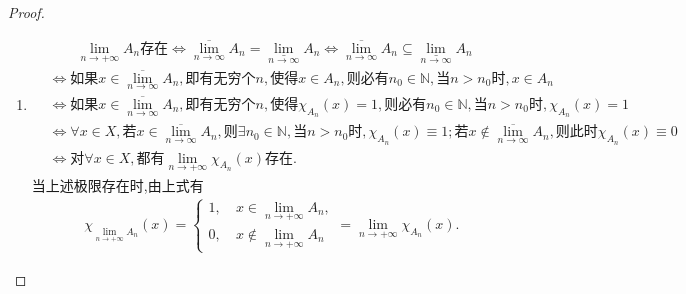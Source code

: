 \documentclass[../../main.tex]{subfiles}%
\begin{document}
\begin{proof}
\begin{enumerate}[(1)]
\item 
\begin{align*}
&\quad \quad \lim_{n\rightarrow +\infty} A_n\text{存在}\Longleftrightarrow \underset{n\rightarrow \infty}{\overline{\lim }}A_n=\underset{n\rightarrow \infty}{\underline{\lim }}A_n\Longleftrightarrow \underset{n\rightarrow \infty}{\overline{\lim }}A_n\subseteq \underset{n\rightarrow \infty}{\underline{\lim }}A_n\\
&\Longleftrightarrow \text{如果}x\in \underset{n\rightarrow \infty}{\overline{\lim }}A_n,\text{即有无穷个}n,\text{使得}x\in A_n,\text{则必有}n_0\in \mathbb{N} ,\text{当}n>n_0\text{时},x\in A_n\\
&\Longleftrightarrow \text{如果}x\in \underset{n\rightarrow \infty}{\overline{\lim }}A_n,\text{即有无穷个}n,\text{使得}\chi _{A_n}(x)=1,\text{则必有}n_0\in \mathbb{N} ,\text{当}n>n_0\text{时},\chi _{A_n}(x)=1\\
&\Longleftrightarrow \forall x\in X,\text{若}x\in \underset{n\rightarrow \infty}{\overline{\lim }}A_n,\text{则}\exists n_0\in \mathbb{N} ,\text{当}n>n_0\text{时},\chi _{A_n}(x)\equiv 1;\text{若}x\notin \underset{n\rightarrow \infty}{\overline{\lim }}A_n,\text{则此时}\chi _{A_n}(x)\equiv 0\\
&\Longleftrightarrow \text{对}\forall x\in X,\text{都有}\lim_{n\rightarrow +\infty} \chi _{A_n}(x)\text{存在}.
\end{align*}
当上述极限存在时,由上式有
\begin{align*}
\chi_{\lim\limits_{n\to+\infty}A_n}(x)=\begin{cases}1,\ &x\in\lim\limits_{n\to+\infty}A_n,\\0,\ &x\notin\lim\limits_{n\to+\infty}A_n\end{cases}=\lim\limits_{n\to+\infty}\chi_{A_n}(x).
\end{align*}
\end{enumerate}

\end{proof}
\end{document}
